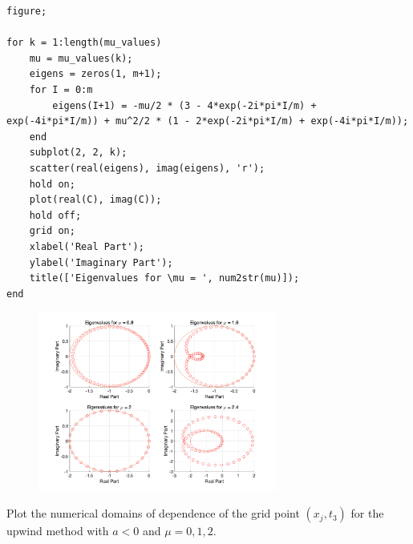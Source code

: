 \documentclass[lang=cn,a4paper,newtx,bibend=bibtex]{elegantpaper}
\begin{document}
\begin{solution}
\begin{lstlisting}
figure;

for k = 1:length(mu_values)
    mu = mu_values(k);
    eigens = zeros(1, m+1);
    for I = 0:m
        eigens(I+1) = -mu/2 * (3 - 4*exp(-2i*pi*I/m) + exp(-4i*pi*I/m)) + mu^2/2 * (1 - 2*exp(-2i*pi*I/m) + exp(-4i*pi*I/m));
    end
    subplot(2, 2, k);
    scatter(real(eigens), imag(eigens), 'r');
    hold on;
    plot(real(C), imag(C));
    hold off;
    grid on;
    xlabel('Real Part');
    ylabel('Imaginary Part');
    title(['Eigenvalues for \mu = ', num2str(mu)]);
end
  \end{lstlisting}
  \begin{figure}[H]
    \centering
    \includegraphics[width=0.7\textwidth]{1.png}
  \end{figure}
\end{solution}

\begin{prob}[Exercise 11.82]
  Plot the numerical domains of dependence of the grid point $(x_j,t_3)$
  for the upwind method with $a<0$ and $\mu=0,1,2$.
\end{prob}
\end{document}
